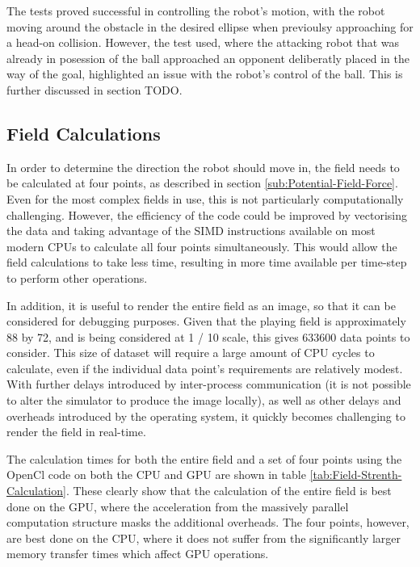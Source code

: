 \documentclass[10pt]{article} \usepackage[a4paper]{geometry}
\begin{document}
The tests proved successful in controlling the robot's motion, with the robot
moving around the obstacle in the desired ellipse when previoulsy approaching
for a head-on collision.  However, the test used, where the attacking robot that
was already in posession of the ball approached an opponent deliberatly placed
in the way of the goal, highlighted an issue with the robot's control of the
ball.  This is further discussed in section TODO.

\subsection{Field Calculations}

In order to determine the direction the robot should move in, the field needs to
be calculated at four points, as described in section
\ref{sub:Potential-Field-Force}. Even for the most complex fields in use, this
is not particularly computationally challenging. However, the efficiency of the
code could be improved by vectorising the data and taking advantage of the
\ac{SIMD} instructions available on most modern \acp{CPU} to calculate all four
points simultaneously. This would allow the field calculations to take less
time, resulting in more time available per time-step to perform other
operations.

In addition, it is useful to render the entire field as an image, so that it can
be considered for debugging purposes. Given that the playing field is
approximately \SI{88}{\inch} by \SI{72}{\inch}, and is being considered at
\SI[quotient-mode = fraction]{1 / 10}{\inch} scale, this gives \num{633600} data
points to consider. This size of dataset will require a large amount of \ac{CPU}
cycles to calculate, even if the individual data point's requirements are
relatively modest. With further delays introduced by inter-process communication
(it is not possible to alter the simulator to produce the image locally), as
well as other delays and overheads introduced by the operating system, it
quickly becomes challenging to render the field in real-time.

The calculation times for both the entire field and a set of four points using
the OpenCl code on both the \ac{CPU} and \ac{GPU} are shown in table
\ref{tab:Field-Strenth-Calculation}. These clearly show that the calculation of
the entire field is best done on the GPU, where the acceleration from the
massively parallel computation structure masks the additional overheads. The
four points, however, are best done on the \ac{CPU}, where it does not suffer
from the significantly larger memory transfer times which affect \ac{GPU}
operations.
\end{document}
